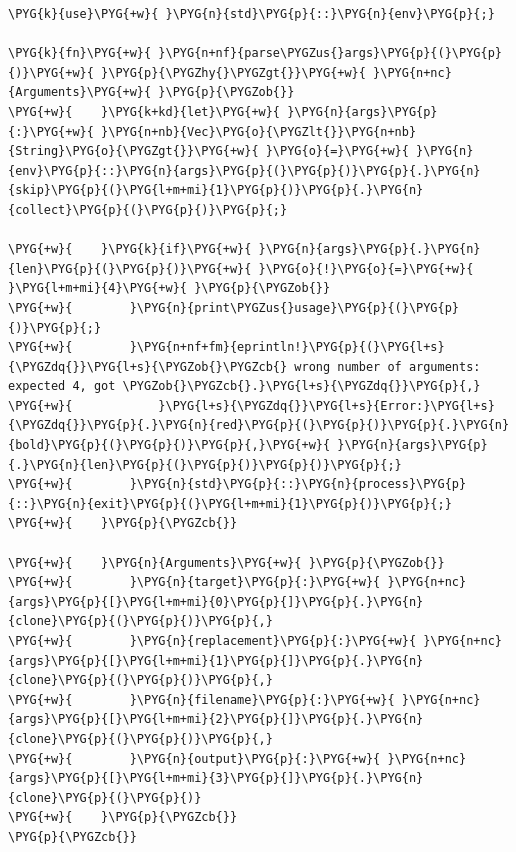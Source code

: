 \begin{Verbatim}[commandchars=\\\{\},breaklines=true,breakanywhere=true,fontsize=\codefont,xleftmargin=17bp]
\PYG{k}{use}\PYG{+w}{ }\PYG{n}{std}\PYG{p}{::}\PYG{n}{env}\PYG{p}{;}

\PYG{k}{fn}\PYG{+w}{ }\PYG{n+nf}{parse\PYGZus{}args}\PYG{p}{(}\PYG{p}{)}\PYG{+w}{ }\PYG{p}{\PYGZhy{}\PYGZgt{}}\PYG{+w}{ }\PYG{n+nc}{Arguments}\PYG{+w}{ }\PYG{p}{\PYGZob{}}
\PYG{+w}{    }\PYG{k+kd}{let}\PYG{+w}{ }\PYG{n}{args}\PYG{p}{:}\PYG{+w}{ }\PYG{n+nb}{Vec}\PYG{o}{\PYGZlt{}}\PYG{n+nb}{String}\PYG{o}{\PYGZgt{}}\PYG{+w}{ }\PYG{o}{=}\PYG{+w}{ }\PYG{n}{env}\PYG{p}{::}\PYG{n}{args}\PYG{p}{(}\PYG{p}{)}\PYG{p}{.}\PYG{n}{skip}\PYG{p}{(}\PYG{l+m+mi}{1}\PYG{p}{)}\PYG{p}{.}\PYG{n}{collect}\PYG{p}{(}\PYG{p}{)}\PYG{p}{;}

\PYG{+w}{    }\PYG{k}{if}\PYG{+w}{ }\PYG{n}{args}\PYG{p}{.}\PYG{n}{len}\PYG{p}{(}\PYG{p}{)}\PYG{+w}{ }\PYG{o}{!}\PYG{o}{=}\PYG{+w}{ }\PYG{l+m+mi}{4}\PYG{+w}{ }\PYG{p}{\PYGZob{}}
\PYG{+w}{        }\PYG{n}{print\PYGZus{}usage}\PYG{p}{(}\PYG{p}{)}\PYG{p}{;}
\PYG{+w}{        }\PYG{n+nf+fm}{eprintln!}\PYG{p}{(}\PYG{l+s}{\PYGZdq{}}\PYG{l+s}{\PYGZob{}\PYGZcb{} wrong number of arguments: expected 4, got \PYGZob{}\PYGZcb{}.}\PYG{l+s}{\PYGZdq{}}\PYG{p}{,}
\PYG{+w}{            }\PYG{l+s}{\PYGZdq{}}\PYG{l+s}{Error:}\PYG{l+s}{\PYGZdq{}}\PYG{p}{.}\PYG{n}{red}\PYG{p}{(}\PYG{p}{)}\PYG{p}{.}\PYG{n}{bold}\PYG{p}{(}\PYG{p}{)}\PYG{p}{,}\PYG{+w}{ }\PYG{n}{args}\PYG{p}{.}\PYG{n}{len}\PYG{p}{(}\PYG{p}{)}\PYG{p}{)}\PYG{p}{;}
\PYG{+w}{        }\PYG{n}{std}\PYG{p}{::}\PYG{n}{process}\PYG{p}{::}\PYG{n}{exit}\PYG{p}{(}\PYG{l+m+mi}{1}\PYG{p}{)}\PYG{p}{;}
\PYG{+w}{    }\PYG{p}{\PYGZcb{}}

\PYG{+w}{    }\PYG{n}{Arguments}\PYG{+w}{ }\PYG{p}{\PYGZob{}}
\PYG{+w}{        }\PYG{n}{target}\PYG{p}{:}\PYG{+w}{ }\PYG{n+nc}{args}\PYG{p}{[}\PYG{l+m+mi}{0}\PYG{p}{]}\PYG{p}{.}\PYG{n}{clone}\PYG{p}{(}\PYG{p}{)}\PYG{p}{,}
\PYG{+w}{        }\PYG{n}{replacement}\PYG{p}{:}\PYG{+w}{ }\PYG{n+nc}{args}\PYG{p}{[}\PYG{l+m+mi}{1}\PYG{p}{]}\PYG{p}{.}\PYG{n}{clone}\PYG{p}{(}\PYG{p}{)}\PYG{p}{,}
\PYG{+w}{        }\PYG{n}{filename}\PYG{p}{:}\PYG{+w}{ }\PYG{n+nc}{args}\PYG{p}{[}\PYG{l+m+mi}{2}\PYG{p}{]}\PYG{p}{.}\PYG{n}{clone}\PYG{p}{(}\PYG{p}{)}\PYG{p}{,}
\PYG{+w}{        }\PYG{n}{output}\PYG{p}{:}\PYG{+w}{ }\PYG{n+nc}{args}\PYG{p}{[}\PYG{l+m+mi}{3}\PYG{p}{]}\PYG{p}{.}\PYG{n}{clone}\PYG{p}{(}\PYG{p}{)}
\PYG{+w}{    }\PYG{p}{\PYGZcb{}}
\PYG{p}{\PYGZcb{}}
\end{Verbatim}

